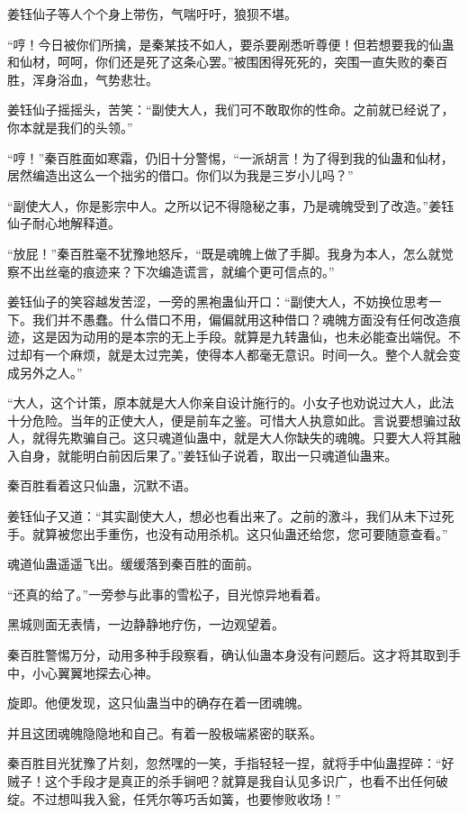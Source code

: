 \begin{this_body}
姜钰仙子等人个个身上带伤，气喘吁吁，狼狈不堪。

“哼！今日被你们所擒，是秦某技不如人，要杀要剐悉听尊便！但若想要我的仙蛊和仙材，呵呵，你们还是死了这条心罢。”被围困得死死的，突围一直失败的秦百胜，浑身浴血，气势悲壮。

姜钰仙子摇摇头，苦笑：“副使大人，我们可不敢取你的性命。之前就已经说了，你本就是我们的头领。”

“哼！”秦百胜面如寒霜，仍旧十分警惕，“一派胡言！为了得到我的仙蛊和仙材，居然编造出这么一个拙劣的借口。你们以为我是三岁小儿吗？”

“副使大人，你是影宗中人。之所以记不得隐秘之事，乃是魂魄受到了改造。”姜钰仙子耐心地解释道。

“放屁！”秦百胜毫不犹豫地怒斥，“既是魂魄上做了手脚。我身为本人，怎么就觉察不出丝毫的痕迹来？下次编造谎言，就编个更可信点的。”

姜钰仙子的笑容越发苦涩，一旁的黑袍蛊仙开口：“副使大人，不妨换位思考一下。我们并不愚蠢。什么借口不用，偏偏就用这种借口？魂魄方面没有任何改造痕迹，这是因为动用的是本宗的无上手段。就算是九转蛊仙，也未必能查出端倪。不过却有一个麻烦，就是太过完美，使得本人都毫无意识。时间一久。整个人就会变成另外之人。”

“大人，这个计策，原本就是大人你亲自设计施行的。小女子也劝说过大人，此法十分危险。当年的正使大人，便是前车之鉴。可惜大人执意如此。言说要想骗过敌人，就得先欺骗自己。这只魂道仙蛊中，就是大人你缺失的魂魄。只要大人将其融入自身，就能明白前因后果了。”姜钰仙子说着，取出一只魂道仙蛊来。

秦百胜看着这只仙蛊，沉默不语。

姜钰仙子又道：“其实副使大人，想必也看出来了。之前的激斗，我们从未下过死手。就算被您出手重伤，也没有动用杀机。这只仙蛊还给您，您可要随意查看。”

魂道仙蛊遥遥飞出。缓缓落到秦百胜的面前。

“还真的给了。”一旁参与此事的雪松子，目光惊异地看着。

黑城则面无表情，一边静静地疗伤，一边观望着。

秦百胜警惕万分，动用多种手段察看，确认仙蛊本身没有问题后。这才将其取到手中，小心翼翼地探去心神。

旋即。他便发现，这只仙蛊当中的确存在着一团魂魄。

并且这团魂魄隐隐地和自己。有着一股极端紧密的联系。

秦百胜目光犹豫了片刻，忽然嘿的一笑，手指轻轻一捏，就将手中仙蛊捏碎：“好贼子！这个手段才是真正的杀手锏吧？就算是我自认见多识广，也看不出任何破绽。不过想叫我入瓮，任凭尔等巧舌如簧，也要惨败收场！”


\end{this_body}
